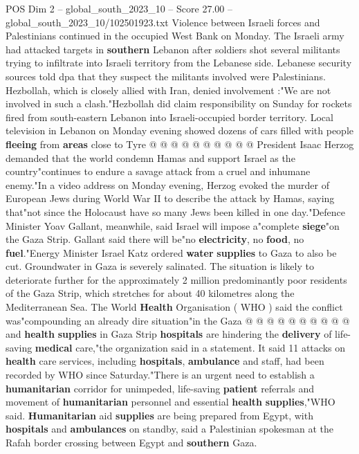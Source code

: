 \begin{textsample}{POS Dim 2 – global\_south\_2023\_10 – Score 27.00 – global\_south\_2023\_10/102501923.txt}
Violence between Israeli forces and Palestinians continued in the occupied West Bank on Monday.
The Israeli army had attacked targets in \textbf{southern} Lebanon after soldiers shot several militants trying to infiltrate into Israeli territory from the Lebanese side.
Lebanese security sources told dpa that they suspect the militants involved were Palestinians.
Hezbollah, which is closely allied with Iran, denied involvement :"We are not involved in such a clash."Hezbollah did claim responsibility on Sunday for rockets fired from south-eastern Lebanon into Israeli-occupied border territory.
Local television in Lebanon on Monday evening showed dozens of cars filled with people \textbf{fleeing} from \textbf{areas} close to Tyre @ @ @ @ @ @ @ @ @ @ President Isaac Herzog demanded that the world condemn Hamas and support Israel as the country"continues to endure a savage attack from a cruel and inhumane enemy."In a video address on Monday evening, Herzog evoked the murder of European Jews during World War II to describe the attack by Hamas, saying that"not since the Holocaust have so many Jews been killed in one day."Defence Minister Yoav Gallant, meanwhile, said Israel will impose a"complete \textbf{siege}"on the Gaza Strip.
Gallant said there will be"no \textbf{electricity}, no \textbf{food}, no \textbf{fuel}."Energy Minister Israel Katz ordered \textbf{water} \textbf{supplies} to Gaza to also be cut.
Groundwater in Gaza is severely salinated.
The situation is likely to deteriorate further for the approximately 2 million predominantly poor residents of the Gaza Strip, which stretches for about 40 kilometres along the Mediterranean Sea.
The World \textbf{Health} Organisation ( WHO ) said the conflict was"compounding an already dire situation"in the Gaza @ @ @ @ @ @ @ @ @ @ and \textbf{health} \textbf{supplies} in Gaza Strip \textbf{hospitals} are hindering the \textbf{delivery} of life-saving \textbf{medical} care,"the organization said in a statement.
It said 11 attacks on \textbf{health} care services, including \textbf{hospitals}, \textbf{ambulance} and staff, had been recorded by WHO since Saturday."There is an urgent need to establish a \textbf{humanitarian} corridor for unimpeded, life-saving \textbf{patient} referrals and movement of \textbf{humanitarian} personnel and essential \textbf{health} \textbf{supplies},"WHO said. \textbf{Humanitarian} aid \textbf{supplies} are being prepared from Egypt, with \textbf{hospitals} and \textbf{ambulances} on standby, said a Palestinian spokesman at the Rafah border crossing between Egypt and \textbf{southern} Gaza.

\end{textsample}
